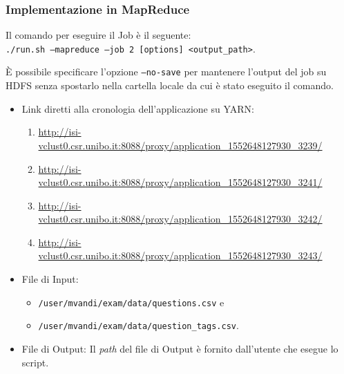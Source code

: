 \documentclass[10pt]{article}
\begin{document}
\subsubsection{Implementazione in MapReduce}
Il comando per eseguire il Job è il seguente:\\
\texttt{./run.sh --mapreduce --job 2 [options] <output\_path>}.

\`E possibile specificare l'opzione \texttt{--no-save} per mantenere l'output del job su HDFS senza spostarlo nella cartella locale da cui è stato eseguito il comando.

\begin{itemize}
\item Link diretti alla cronologia dell'applicazione su YARN:
\begin{enumerate}
    \item \url{http://isi-vclust0.csr.unibo.it:8088/proxy/application_1552648127930_3239/}
    \item \url{http://isi-vclust0.csr.unibo.it:8088/proxy/application_1552648127930_3241/}
    \item \url{http://isi-vclust0.csr.unibo.it:8088/proxy/application_1552648127930_3242/}
    \item \url{http://isi-vclust0.csr.unibo.it:8088/proxy/application_1552648127930_3243/}
\end{enumerate}
\item File di Input:
\begin{itemize}
\item \texttt{/user/mvandi/exam/data/questions.csv} e\\
\item \texttt{/user/mvandi/exam/data/question\_tags.csv}.
\end{itemize}
\item File di Output: Il \textit{path} del file di Output è fornito dall'utente che esegue lo script.
\end{itemize}
\end{document}
